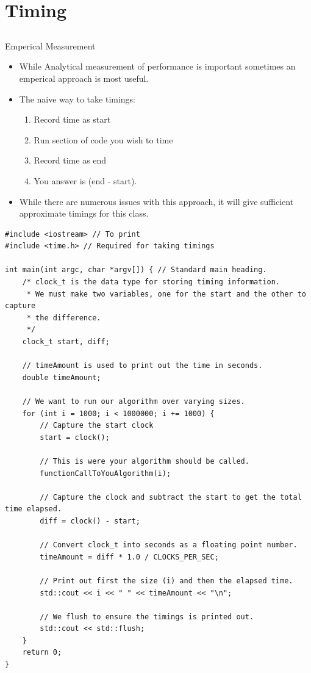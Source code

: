 \documentclass{beamer}
\begin{document}
\section{Timing}
\subsection{}

\begin{frame}{Emperical Measurement}
\begin{itemize}
\item While Analytical measurement of performance is important sometimes an emperical approach is most useful.
\item The naive way to take timings:
\begin{enumerate}
\item Record time as start
\item Run section of code you wish to time
\item Record time as end
\item You answer is (end - start).
\end{enumerate}
\item While there are numerous issues with this approach, it will give sufficient approximate timings for this class.
\end{itemize}
\end{frame}

\begin{frame}[fragile]{}
\begin{lstlisting}
#include <iostream> // To print
#include <time.h> // Required for taking timings

int main(int argc, char *argv[]) { // Standard main heading.
    /* clock_t is the data type for storing timing information.
     * We must make two variables, one for the start and the other to capture
     * the difference.
     */
    clock_t start, diff;

    // timeAmount is used to print out the time in seconds.
    double timeAmount;

    // We want to run our algorithm over varying sizes.
    for (int i = 1000; i < 1000000; i += 1000) {
        // Capture the start clock
        start = clock();

        // This is were your algorithm should be called.
        functionCallToYouAlgorithm(i);

        // Capture the clock and subtract the start to get the total time elapsed.
        diff = clock() - start;

        // Convert clock_t into seconds as a floating point number.
        timeAmount = diff * 1.0 / CLOCKS_PER_SEC;

        // Print out first the size (i) and then the elapsed time.
        std::cout << i << " " << timeAmount << "\n";

        // We flush to ensure the timings is printed out.
        std::cout << std::flush;
    }
    return 0;
}

\end{lstlisting}
\end{frame}
\end{document}
